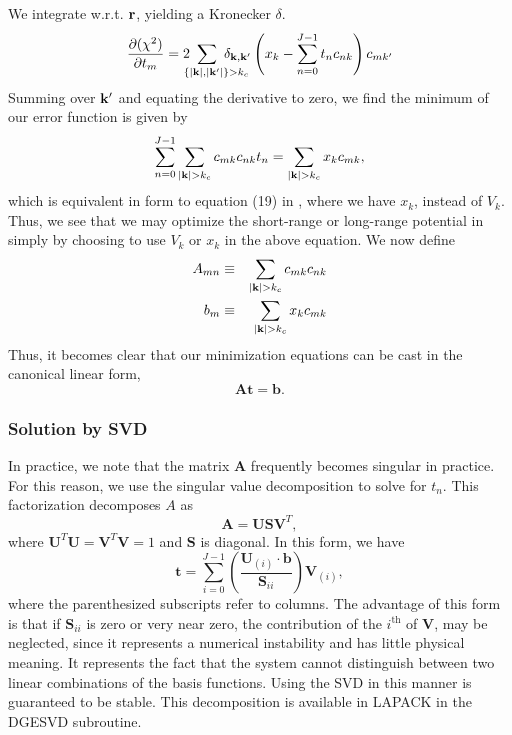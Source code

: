 We integrate w.r.t. $\mathbf{r}$, yielding a Kronecker $\delta$.
\begin{equation}
\frac{\partial (\chi^2)}{\partial t_{m}} =
2 \ns\ns\ns\ns\ns\ns\ns 
\sum_{\ \ \ \ \{|\vk|,|\vk'|\}>k_c} \ns\ns\ns\ns\ns\ns\ns \delta_{\vk, \vk'} 
\left(x_k -\sum_{n=0}^{J-1} t_n c_{nk} \right) c_{mk'}
\end{equation}
Summing over $\mathbf{k}'$ and equating the derivative to zero, we find the
minimum of our error function is given by
\begin{equation}
\sum_{n=0}^{J-1} \sum_{|\vk|>k_c} c_{mk}c_{nk} t_n = 
\sum_{|\vk|>k_c} x_k c_{mk},
\end{equation}
which is equivalent in form to equation (19) in \cite{Natoli1995}, where
we have $x_k$, instead of $V_k$.  Thus, we see that we may optimize
the short-range or long-range potential in simply by choosing to use
$V_k$ or $x_k$ in the above equation.  We now define
\begin{eqnarray}
A_{mn} & \equiv & \sum_{|\vk|>k_c} c_{mk} c_{nk} \\
b_{m} & \equiv & \sum_{|\vk|>k_c} x_k c_{mk}
\end{eqnarray}
Thus, it becomes clear that our minimization equations can be cast in
the canonical linear form,
\newcommand{\bA}{\mathbf{A}}
\newcommand{\bU}{\mathbf{U}}
\newcommand{\bV}{\mathbf{V}}
\newcommand{\bb}{\mathbf{b}}
\newcommand{\bS}{\mathbf{S}}
\begin{equation}
\bA\mathbf{t} = \mathbf{b}.
\end{equation}

\subsubsection{Solution by SVD}
In practice, we note that the matrix $\bA$ frequently becomes singular
in practice.  For this reason, we use the singular value decomposition
to solve for $t_n$.  This factorization decomposes $A$ as
\begin{equation}
\bA = \bU \bS \bV^T,
\end{equation}
where $\bU^T\bU = \bV^T\bV = 1$ and $\bS$ is diagonal.  In this form, we have
\begin{equation}
\mathbf{t} = \sum_{i=0}^{J-1} \left( \frac{\bU_{(i)} \cdot
  \bb}{\bS_{ii}} \right) \bV_{(i)},
\end{equation}
where the parenthesized subscripts refer to columns.  The advantage of
this form is that if $\bS_{ii}$ is zero or very near zero, the
contribution of the $i^{\text{th}}$ of $\bV$, may be neglected, since
it represents a numerical instability and has little physical
meaning.  It represents the fact that the system cannot distinguish
between two linear combinations of the basis functions.  Using the SVD
in this manner is guaranteed to be stable.  This decomposition is
available in LAPACK in the DGESVD subroutine.

